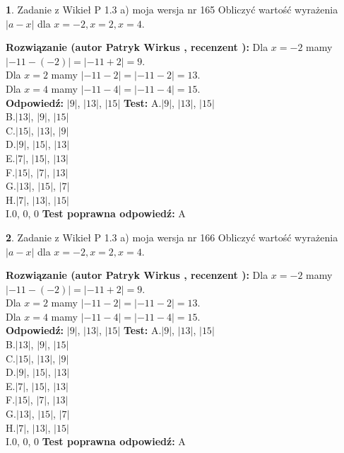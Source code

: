\documentclass[12pt, a4paper]{article}
\theoremstyle{definition} %
\newtheorem{zad}{}
\newcommand{\zadStart}[1]{\begin{zad}#1\newline}
\newcommand{\zadStop}{\end{zad}}
\newcommand{\rozwStart}[2]{\noindent \textbf{Rozwiązanie (autor #1 , recenzent #2): }\newline}
\newcommand{\rozwStop}{\newline}
\newcommand{\odpStart}{\noindent \textbf{Odpowiedź:}\newline}
\newcommand{\odpStop}{\newline}
\newcommand{\testStart}{\noindent \textbf{Test:}\newline}
\newcommand{\testStop}{\newline}
\newcommand{\kluczStart}{\noindent \textbf{Test poprawna odpowiedź:}\newline}
\newcommand{\kluczStop}{\newline}
\begin{document}
\zadStart{Zadanie z Wikieł P 1.3 a) moja wersja nr 165}
Obliczyć wartość wyrażenia $|a - x|$ dla $x=-2,x=2,x=4$.
\zadStop
\rozwStart{Patryk Wirkus}{}
Dla $x = -2$ mamy $|-11 - (-2)| = |-11 + 2| = 9$.\\
Dla $x = 2$ mamy $|-11 - 2| = |-11 - 2| = 13$.\\
Dla $x = 4$ mamy $|-11 - 4| = |-11 - 4| = 15$.\\
\rozwStop
\odpStart
$|9|$, $|13|$, $|15|$
\odpStop
\testStart
A.$|9|$, $|13|$, $|15|$\\
B.$|13|$, $|9|$, $|15|$\\
C.$|15|$, $|13|$, $|9|$\\
D.$|9|$, $|15|$, $|13|$\\
E.$|7|$, $|15|$, $|13|$\\
F.$|15|$, $|7|$, $|13|$\\
G.$|13|$, $|15|$, $|7|$\\
H.$|7|$, $|13|$, $|15|$\\
I.$0$, $0$, $0$
\testStop
\kluczStart
A
\kluczStop



\zadStart{Zadanie z Wikieł P 1.3 a) moja wersja nr 166}
Obliczyć wartość wyrażenia $|a - x|$ dla $x=-2,x=2,x=4$.
\zadStop
\rozwStart{Patryk Wirkus}{}
Dla $x = -2$ mamy $|-11 - (-2)| = |-11 + 2| = 9$.\\
Dla $x = 2$ mamy $|-11 - 2| = |-11 - 2| = 13$.\\
Dla $x = 4$ mamy $|-11 - 4| = |-11 - 4| = 15$.\\
\rozwStop
\odpStart
$|9|$, $|13|$, $|15|$
\odpStop
\testStart
A.$|9|$, $|13|$, $|15|$\\
B.$|13|$, $|9|$, $|15|$\\
C.$|15|$, $|13|$, $|9|$\\
D.$|9|$, $|15|$, $|13|$\\
E.$|7|$, $|15|$, $|13|$\\
F.$|15|$, $|7|$, $|13|$\\
G.$|13|$, $|15|$, $|7|$\\
H.$|7|$, $|13|$, $|15|$\\
I.$0$, $0$, $0$
\testStop
\kluczStart
A
\kluczStop
\end{document}
